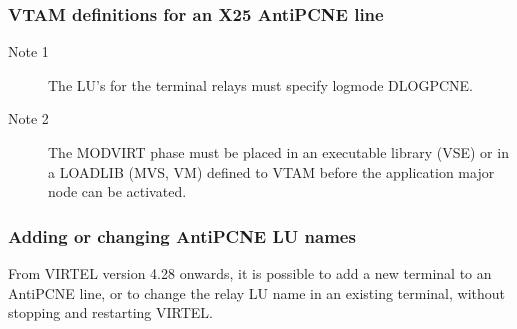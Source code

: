 \documentclass[letterpaper,10pt,english]{sphinxmanual}
\begin{document}
\subsubsection{VTAM definitions for an X25 AntiPCNE line}
\label{\detokenize{connectivity_guide:vtam-definitions-for-an-x25-antipcne-line}}\begin{description}
\item[{Note 1}] \leavevmode
The LU’s for the terminal relays must specify logmode DLOGPCNE.

\item[{Note 2}] \leavevmode
The MODVIRT phase must be placed in an executable library (VSE) or
in a LOADLIB (MVS, VM) defined to VTAM before the application major
node can be activated.

\end{description}


\subsubsection{Adding or changing AntiPCNE LU names}
\label{\detokenize{connectivity_guide:adding-or-changing-antipcne-lu-names}}
From VIRTEL version 4.28 onwards, it is possible to add a new terminal to an AntiPCNE line, or to change the relay LU name in an existing terminal, without stopping and restarting VIRTEL.
\end{document}
